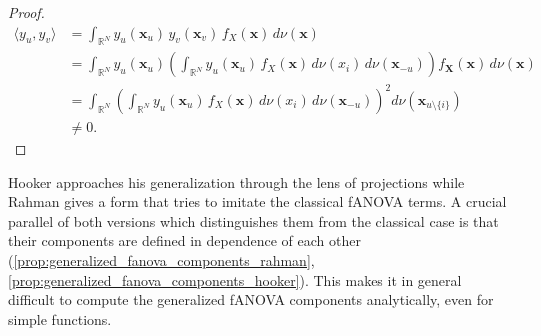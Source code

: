 \begin{proof}
\begin{align*}
    \langle y_u, y_v \rangle
        &= \int_{\mathbb{R}^N} y_u(\boldsymbol{x}_u) \, y_v(\boldsymbol{x}_v) \, f_X(\boldsymbol{x}) \, d \nu(\boldsymbol{x}) \\
        &= \int_{\mathbb{R}^N} y_u(\boldsymbol{x}_u) 
           \left( \int_{\mathbb{R}^N} y_u(\boldsymbol{x}_u) \, f_X(\boldsymbol{x}) \, d \nu(x_i) \, d \nu(\boldsymbol{x}_{-u}) \right) 
           f_{\boldsymbol{X}}(\boldsymbol{x}) \, d \nu(\boldsymbol{x}) \\
        &= \int_{\mathbb{R}^N} 
           \left( \int_{\mathbb{R}^N} y_u(\boldsymbol{x}_u) \, f_X(\boldsymbol{x}) \, d \nu(x_i) \, d \nu(\boldsymbol{x}_{-u}) \right)^2 
           d \nu(\boldsymbol{x}_{u \setminus \{i\}}) \\
        &\neq 0.
\end{align*}
\end{proof}
Hooker approaches his generalization through the lens of projections while Rahman gives a form that tries to imitate the classical fANOVA terms. A crucial parallel of both versions which distinguishes them from the classical case is that their components are defined in dependence of each other (\autoref{prop:generalized_fanova_components_rahman}, \autoref{prop:generalized_fanova_components_hooker}).
This makes it in general difficult to compute the generalized fANOVA components analytically, even for simple functions.
